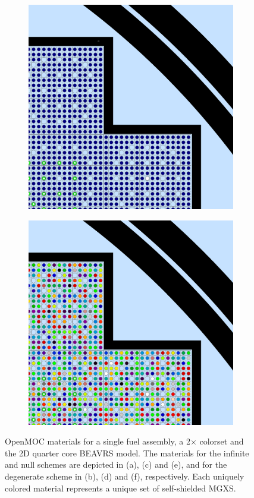 \begin{figure}[h!]
\begin{subfigure}{.5\textwidth}
  \centering
  \includegraphics[width=0.8\linewidth]{figures/quantification/homogenization/full-core-null-materials}
  \caption{}
  \label{fig:chap8-full-core-null-materials}
\end{subfigure}%
\begin{subfigure}{.5\textwidth}
  \centering
  \includegraphics[width=0.8\linewidth]{figures/quantification/homogenization/full-core-degenerate-materials}
  \caption{}
  \label{fig:chap8-full-core-degenerate-materials}
\end{subfigure}
\caption[Depiction of infinite, null and degenerate spatial homogenization schemes]{OpenMOC materials for a single fuel assembly, a 2$\times$ colorset and the 2D quarter core \ac{BEAVRS} model. The materials for the infinite and null schemes are depicted in (a), (c) and (e), and for the degenerate scheme in (b), (d) and (f), respectively. Each uniquely colored material represents a unique set of self-shielded \ac{MGXS}.}
\label{fig:chap8-homogenization-schemes}
\end{figure}

